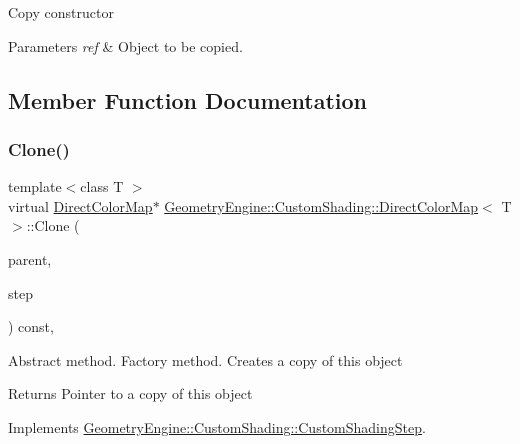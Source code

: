 Copy constructor 
\begin{DoxyParams}{Parameters}
{\em ref} & Object to be copied. \\
\hline
\end{DoxyParams}


\subsection{Member Function Documentation}
\mbox{\label{class_geometry_engine_1_1_custom_shading_1_1_direct_color_map_aef31a0e4c639e006292dde48e9d2c710}} 
\subsubsection{\texorpdfstring{Clone()}{Clone()}}
{\footnotesize\ttfamily template$<$class T $>$ \\
virtual \mbox{\hyperlink{class_geometry_engine_1_1_custom_shading_1_1_direct_color_map}{Direct\+Color\+Map}}$\ast$ \mbox{\hyperlink{class_geometry_engine_1_1_custom_shading_1_1_direct_color_map}{Geometry\+Engine\+::\+Custom\+Shading\+::\+Direct\+Color\+Map}}$<$ T $>$\+::Clone (\begin{DoxyParamCaption}\item[{\mbox{\hyperlink{class_geometry_engine_1_1_custom_shading_1_1_custom_shading_interface}{Custom\+Shading\+Interface}} $\ast$}]{parent,  }\item[{\mbox{\hyperlink{namespace_geometry_engine_1_1_custom_shading_a2dc236a5b567da5099069ce2b2be5609}{Custom\+Shading\+Steps}}}]{step }\end{DoxyParamCaption}) const\hspace{0.3cm}{\ttfamily [inline]}, {\ttfamily [virtual]}}

Abstract method. Factory method. Creates a copy of this object \begin{DoxyReturn}{Returns}
Pointer to a copy of this object 
\end{DoxyReturn}


Implements \mbox{\hyperlink{class_geometry_engine_1_1_custom_shading_1_1_custom_shading_step_aa9279c195d3a8f294860a431508675c3}{Geometry\+Engine\+::\+Custom\+Shading\+::\+Custom\+Shading\+Step}}.


